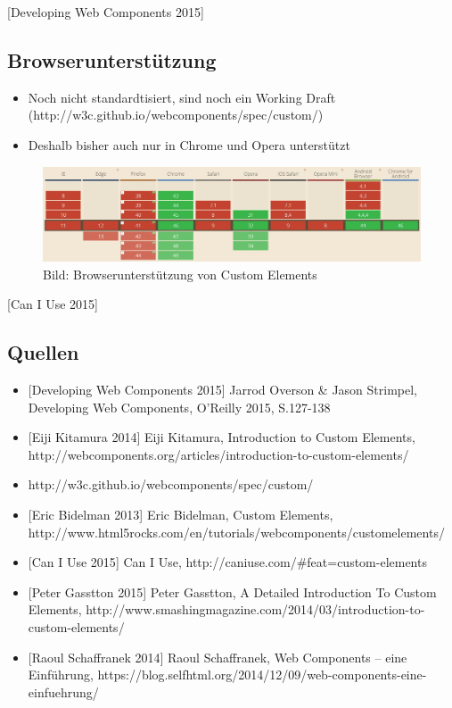 {[}Developing Web Components 2015{]}

\subsection{Browserunterstützung}\label{browserunterstuxfctzung}

\begin{itemize}
\tightlist
\item
  Noch nicht standardtisiert, sind noch ein Working Draft
  (http://w3c.github.io/webcomponents/spec/custom/)
\item
  Deshalb bisher auch nur in Chrome und Opera unterstützt
\end{itemize}

\begin{figure}[htbp]
\centering
\includegraphics{images/1-custom-elements-browserunterstuetzung.jpg}
\caption{Bild: Browserunterstützung von Custom Elements}
\end{figure}

{[}Can I Use 2015{]}

\subsection{Quellen}\label{quellen}

\begin{itemize}
\tightlist
\item
  {[}Developing Web Components 2015{]} Jarrod Overson \& Jason Strimpel,
  Developing Web Components, O'Reilly 2015, S.127-138
\item
  {[}Eiji Kitamura 2014{]} Eiji Kitamura, Introduction to Custom
  Elements,
  http://webcomponents.org/articles/introduction-to-custom-elements/
\item
  http://w3c.github.io/webcomponents/spec/custom/
\item
  {[}Eric Bidelman 2013{]} Eric Bidelman, Custom Elements,
  http://www.html5rocks.com/en/tutorials/webcomponents/customelements/
\item
  {[}Can I Use 2015{]} Can I Use,
  http://caniuse.com/\#feat=custom-elements
\item
  {[}Peter Gasstton 2015{]} Peter Gasstton, A Detailed Introduction To
  Custom Elements,
  http://www.smashingmagazine.com/2014/03/introduction-to-custom-elements/
\item
  {[}Raoul Schaffranek 2014{]} Raoul Schaffranek, Web Components -- eine
  Einführung,
  https://blog.selfhtml.org/2014/12/09/web-components-eine-einfuehrung/
\end{itemize}
